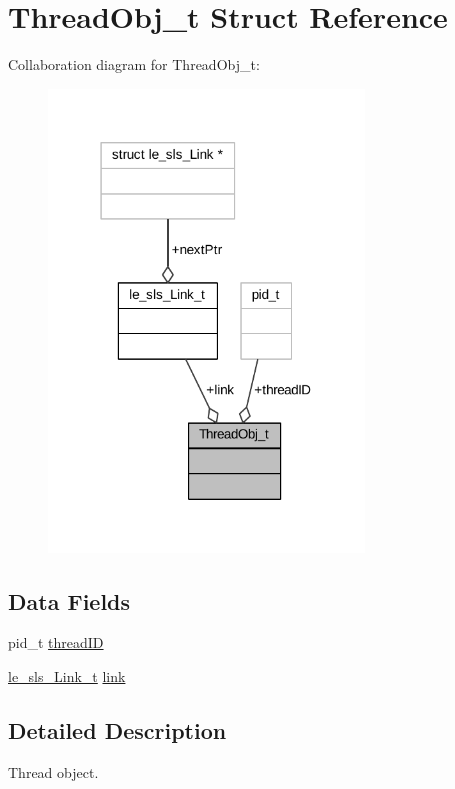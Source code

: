 \hypertarget{struct_thread_obj__t}{}\section{Thread\+Obj\+\_\+t Struct Reference}
\label{struct_thread_obj__t}


Collaboration diagram for Thread\+Obj\+\_\+t\+:
\nopagebreak
\begin{figure}[H]
\begin{center}
\leavevmode
\includegraphics[width=238pt]{struct_thread_obj__t__coll__graph}
\end{center}
\end{figure}
\subsection*{Data Fields}
\begin{DoxyCompactItemize}
\item 
pid\+\_\+t \hyperlink{struct_thread_obj__t_a3116c3ad8c1a656012572dee23e603f1}{thread\+ID}
\item 
\hyperlink{structle__sls___link__t}{le\+\_\+sls\+\_\+\+Link\+\_\+t} \hyperlink{struct_thread_obj__t_a32ce3c22d16c384ab2f76baa1cbec0f5}{link}
\end{DoxyCompactItemize}


\subsection{Detailed Description}
Thread object. 

